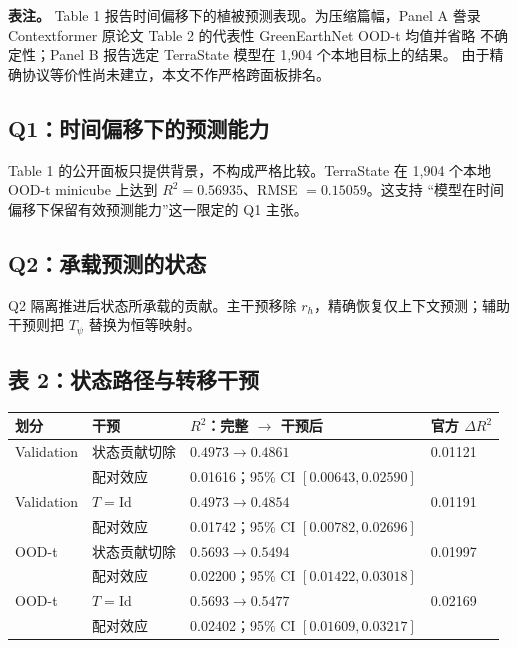 \documentclass[11pt,a4paper,fontset=fandol]{ctexart}
\begin{document}
\textbf{表注。} Table 1 报告时间偏移下的植被预测表现。为压缩篇幅，Panel A 誊录 Contextformer 原论文 Table 2 的代表性 GreenEarthNet OOD-t 均值并省略 不确定性；Panel B 报告选定 TerraState 模型在 1,904 个本地目标上的结果。 由于精确协议等价性尚未建立，本文不作严格跨面板排名。

\subsection{Q1：时间偏移下的预测能力}

Table 1 的公开面板只提供背景，不构成严格比较。TerraState 在 1,904 个本地 OOD-t minicube 上达到 $R^2=0.56935$、RMSE $=0.15059$。这支持 “模型在时间偏移下保留有效预测能力”这一限定的 Q1 主张。

\subsection{Q2：承载预测的状态}

Q2 隔离推进后状态所承载的贡献。主干预移除 $r_h$，精确恢复仅上下文预测；辅助干预则把 $T_\psi$ 替换为恒等映射。

\subsection*{表 2：状态路径与转移干预}

\begin{center}
\small
\begin{tabularx}{\textwidth}{@{}Y Y Y Y@{}}
\toprule
\textbf{划分} & \textbf{干预} & \textbf{$R^2$：完整 $\rightarrow$ 干预后} & \textbf{官方 $\Delta R^2$} \\
\midrule
Validation & 状态贡献切除 & $0.4973\rightarrow0.4861$ & 0.01121 \\
 & 配对效应 & 0.01616；95\% CI $[0.00643,0.02590]$ &  \\
Validation & $T=\mathrm{Id}$ & $0.4973\rightarrow0.4854$ & 0.01191 \\
 & 配对效应 & 0.01742；95\% CI $[0.00782,0.02696]$ &  \\
OOD-t & 状态贡献切除 & $0.5693\rightarrow0.5494$ & 0.01997 \\
 & 配对效应 & 0.02200；95\% CI $[0.01422,0.03018]$ &  \\
OOD-t & $T=\mathrm{Id}$ & $0.5693\rightarrow0.5477$ & 0.02169 \\
 & 配对效应 & 0.02402；95\% CI $[0.01609,0.03217]$ &  \\
\bottomrule
\end{tabularx}
\end{center}
\end{document}
